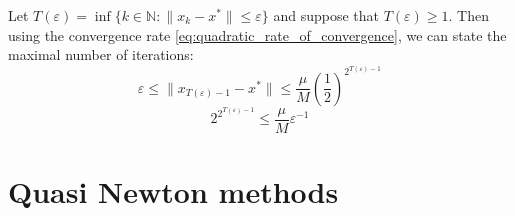 \documentclass[12pt, openany]{report}
\newcommand{\N}{\mathbb{N}}
\theoremstyle{definition}
\begin{document}
Let $T(\varepsilon) = \inf\{k\in\N: \|x_k-x^*\|\leq \varepsilon\}$ and suppose that $T(\varepsilon) \geq 1$. Then using the convergence rate \eqref{eq:quadratic_rate_of_convergence}, we can state the maximal number of iterations:
\begin{equation}
	\varepsilon \leq \|x_{T(\varepsilon)-1}-x^*\| \leq \frac{\mu}{M} \left(\frac{1}{2}\right)^{2^{T(\varepsilon)-1}}
\end{equation}
\begin{equation}
	2^{2^{T(\varepsilon)-1}} \leq \frac{\mu}{M} \varepsilon^{-1}
\end{equation}
\color{red}
\color{black}

\section{Quasi Newton methods}
\end{document}
